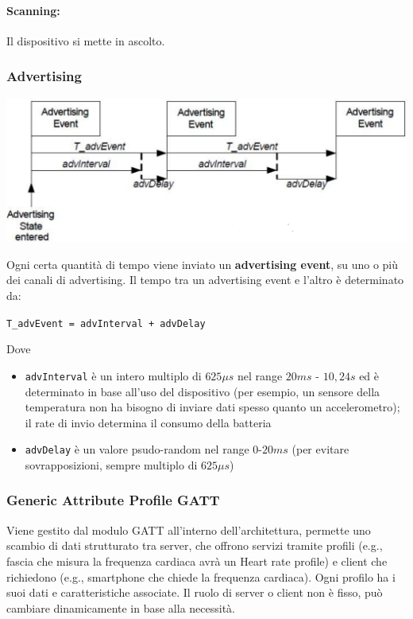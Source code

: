 \paragraph{Scanning:} Il dispositivo si mette in ascolto.\\

\newpage

\subsubsection{Advertising}
\begin{center}
	\includegraphics[width=0.85\linewidth]{img/wpan/bleadvert}
\end{center}

Ogni certa quantità di tempo viene inviato un \textbf{advertising event}, su uno o più dei canali di advertising. Il tempo tra un advertising event e l'altro è determinato da:
\begin{center}
	\texttt{T\_advEvent = advInterval + advDelay}
\end{center}
Dove
\begin{itemize}
	\item \texttt{advInterval} è un intero multiplo di $625 \mu s$ nel range $20 ms$ - $10,24s$ ed è determinato in base all'uso del dispositivo (per esempio, un sensore della temperatura non ha bisogno di inviare dati spesso quanto un accelerometro); il rate di invio determina il consumo della batteria
	\item \texttt{advDelay} è un valore psudo-random nel range $0$-$20ms$ (per evitare sovrapposizioni, sempre multiplo di $625 \mu s$)
\end{itemize}

\subsubsection{Generic Attribute Profile GATT}
Viene gestito dal modulo GATT all'interno dell'architettura, permette uno scambio di dati strutturato tra server, che offrono servizi tramite profili (e.g., fascia che misura la frequenza cardiaca avrà un Heart rate profile) e client che richiedono (e.g., smartphone che chiede la frequenza cardiaca). Ogni profilo ha i suoi dati e caratteristiche associate. Il ruolo di server o client non è fisso, può cambiare dinamicamente in base alla necessità.\\

